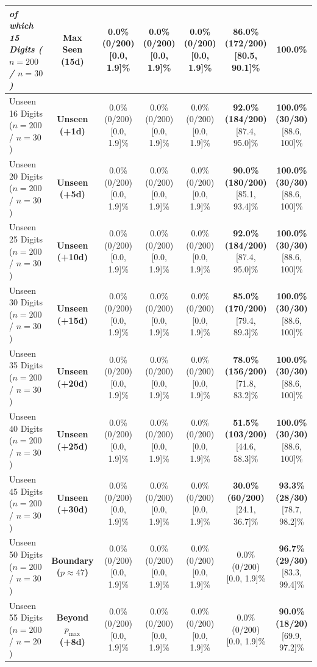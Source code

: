 \documentclass[10pt,twocolumn]{article}
\begin{document}
\begin{table}[t]
{\begin{tabular}{@{}lcccccc@{}}
\quad \textit{of which 15 Digits ($n=200$ / $n=30$)} & Max Seen (15d) & 0.0\% (0/200) [0.0, 1.9]\% & 0.0\% (0/200) [0.0, 1.9]\% & 0.0\% (0/200) [0.0, 1.9]\% & \textbf{86.0\% (172/200)} [80.5, 90.1]\% & \textbf{100.0\%} \\
\midrule
Unseen 16 Digits ($n=200$ / $n=30$) & \textbf{Unseen (+1d)} & 0.0\% (0/200) [0.0, 1.9]\% & 0.0\% (0/200) [0.0, 1.9]\% & 0.0\% (0/200) [0.0, 1.9]\% & \textbf{92.0\% (184/200)} [87.4, 95.0]\% & \textbf{100.0\% (30/30)} [88.6, 100]\% \\
Unseen 20 Digits ($n=200$ / $n=30$) & \textbf{Unseen (+5d)} & 0.0\% (0/200) [0.0, 1.9]\% & 0.0\% (0/200) [0.0, 1.9]\% & 0.0\% (0/200) [0.0, 1.9]\% & \textbf{90.0\% (180/200)} [85.1, 93.4]\% & \textbf{100.0\% (30/30)} [88.6, 100]\% \\
Unseen 25 Digits ($n=200$ / $n=30$) & \textbf{Unseen (+10d)} & 0.0\% (0/200) [0.0, 1.9]\% & 0.0\% (0/200) [0.0, 1.9]\% & 0.0\% (0/200) [0.0, 1.9]\% & \textbf{92.0\% (184/200)} [87.4, 95.0]\% & \textbf{100.0\% (30/30)} [88.6, 100]\% \\
Unseen 30 Digits ($n=200$ / $n=30$) & \textbf{Unseen (+15d)} & 0.0\% (0/200) [0.0, 1.9]\% & 0.0\% (0/200) [0.0, 1.9]\% & 0.0\% (0/200) [0.0, 1.9]\% & \textbf{85.0\% (170/200)} [79.4, 89.3]\% & \textbf{100.0\% (30/30)} [88.6, 100]\% \\
Unseen 35 Digits ($n=200$ / $n=30$) & \textbf{Unseen (+20d)} & 0.0\% (0/200) [0.0, 1.9]\% & 0.0\% (0/200) [0.0, 1.9]\% & 0.0\% (0/200) [0.0, 1.9]\% & \textbf{78.0\% (156/200)} [71.8, 83.2]\% & \textbf{100.0\% (30/30)} [88.6, 100]\% \\
Unseen 40 Digits ($n=200$ / $n=30$) & \textbf{Unseen (+25d)} & 0.0\% (0/200) [0.0, 1.9]\% & 0.0\% (0/200) [0.0, 1.9]\% & 0.0\% (0/200) [0.0, 1.9]\% & \textbf{51.5\% (103/200)} [44.6, 58.3]\% & \textbf{100.0\% (30/30)} [88.6, 100]\% \\
Unseen 45 Digits ($n=200$ / $n=30$) & \textbf{Unseen (+30d)} & 0.0\% (0/200) [0.0, 1.9]\% & 0.0\% (0/200) [0.0, 1.9]\% & 0.0\% (0/200) [0.0, 1.9]\% & \textbf{30.0\% (60/200)} [24.1, 36.7]\% & \textbf{93.3\% (28/30)} [78.7, 98.2]\% \\
Unseen 50 Digits ($n=200$ / $n=30$) & \textbf{Boundary ($p \approx 47$)} & 0.0\% (0/200) [0.0, 1.9]\% & 0.0\% (0/200) [0.0, 1.9]\% & 0.0\% (0/200) [0.0, 1.9]\% & 0.0\% (0/200) [0.0, 1.9]\% & \textbf{96.7\% (29/30)} [83.3, 99.4]\% \\
Unseen 55 Digits ($n=200$ / $n=20$) & \textbf{Beyond $p_{\max}$ (+8d)} & 0.0\% (0/200) [0.0, 1.9]\% & 0.0\% (0/200) [0.0, 1.9]\% & 0.0\% (0/200) [0.0, 1.9]\% & 0.0\% (0/200) [0.0, 1.9]\% & \textbf{90.0\% (18/20)} [69.9, 97.2]\% \\

\end{tabular}}
\end{table}
\end{document}
